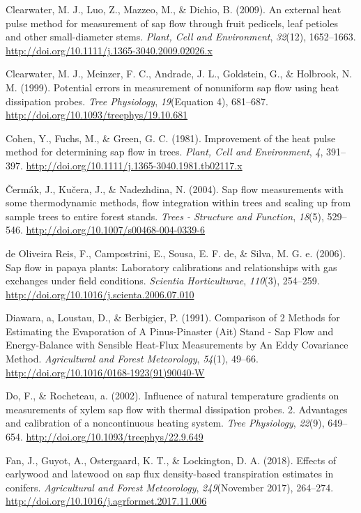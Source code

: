 \documentclass[11pt,twoside]{reedthesis}
\begin{document}
\hypertarget{ref-Clearwater2009}{}
Clearwater, M. J., Luo, Z., Mazzeo, M., \& Dichio, B. (2009). An
external heat pulse method for measurement of sap flow through fruit
pedicels, leaf petioles and other small-diameter stems. \emph{Plant,
Cell and Environment}, \emph{32}(12), 1652--1663.
\url{http://doi.org/10.1111/j.1365-3040.2009.02026.x}

\hypertarget{ref-Clearwater1999}{}
Clearwater, M. J., Meinzer, F. C., Andrade, J. L., Goldstein, G., \&
Holbrook, N. M. (1999). Potential errors in measurement of nonuniform
sap flow using heat dissipation probes. \emph{Tree Physiology},
\emph{19}(Equation 4), 681--687.
\url{http://doi.org/10.1093/treephys/19.10.681}

\hypertarget{ref-Cohen1981}{}
Cohen, Y., Fuchs, M., \& Green, G. C. (1981). Improvement of the heat
pulse method for determining sap flow in trees. \emph{Plant, Cell and
Environment}, \emph{4}, 391--397.
\url{http://doi.org/10.1111/j.1365-3040.1981.tb02117.x}

\hypertarget{ref-Cermak2004}{}
Čermák, J., Kučera, J., \& Nadezhdina, N. (2004). Sap flow measurements
with some thermodynamic methods, flow integration within trees and
scaling up from sample trees to entire forest stands. \emph{Trees -
Structure and Function}, \emph{18}(5), 529--546.
\url{http://doi.org/10.1007/s00468-004-0339-6}

\hypertarget{ref-DeOliveiraReis2006}{}
de Oliveira Reis, F., Campostrini, E., Sousa, E. F. de, \& Silva, M. G.
e. (2006). Sap flow in papaya plants: Laboratory calibrations and
relationships with gas exchanges under field conditions. \emph{Scientia
Horticulturae}, \emph{110}(3), 254--259.
\url{http://doi.org/10.1016/j.scienta.2006.07.010}

\hypertarget{ref-Diawara1991}{}
Diawara, a, Loustau, D., \& Berbigier, P. (1991). Comparison of 2
Methods for Estimating the Evaporation of A Pinus-Pinaster (Ait) Stand -
Sap Flow and Energy-Balance with Sensible Heat-Flux Measurements by An
Eddy Covariance Method. \emph{Agricultural and Forest Meteorology},
\emph{54}(1), 49--66. \url{http://doi.org/10.1016/0168-1923(91)90040-W}

\hypertarget{ref-Do2002}{}
Do, F., \& Rocheteau, a. (2002). Influence of natural temperature
gradients on measurements of xylem sap flow with thermal dissipation
probes. 2. Advantages and calibration of a noncontinuous heating system.
\emph{Tree Physiology}, \emph{22}(9), 649--654.
\url{http://doi.org/10.1093/treephys/22.9.649}

\hypertarget{ref-Fan2018}{}
Fan, J., Guyot, A., Ostergaard, K. T., \& Lockington, D. A. (2018).
Effects of earlywood and latewood on sap flux density-based
transpiration estimates in conifers. \emph{Agricultural and Forest
Meteorology}, \emph{249}(November 2017), 264--274.
\url{http://doi.org/10.1016/j.agrformet.2017.11.006}
\end{document}
